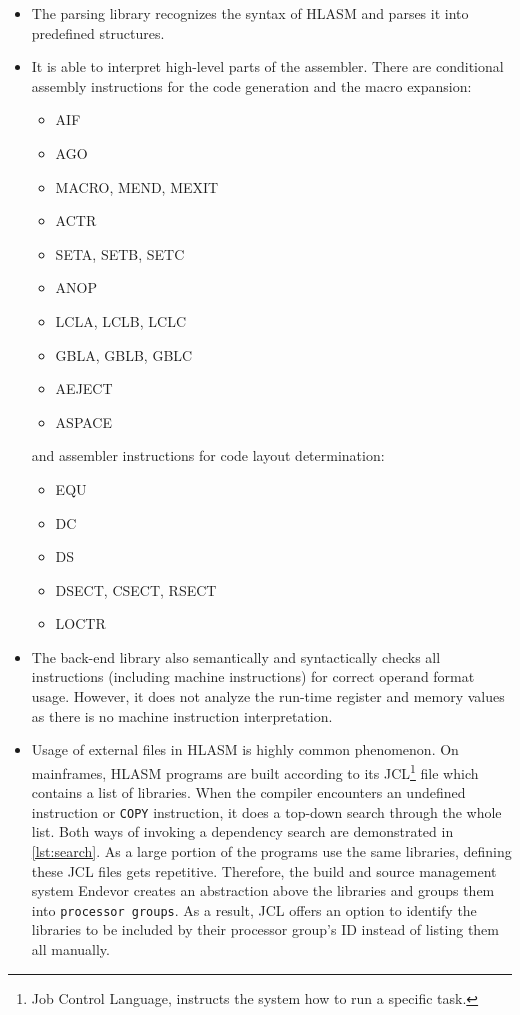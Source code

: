 \begin{itemize}
\item The parsing library recognizes the syntax of HLASM and parses it into predefined structures. 

\item It is able to interpret high-level parts of the assembler. There are conditional assembly instructions for the code generation and the macro expansion:
\begin{itemize}
    \item AIF
    \item AGO
    \item MACRO, MEND, MEXIT
    \item ACTR
    \item SETA, SETB, SETC
    \item ANOP
    \item LCLA, LCLB, LCLC
    \item GBLA, GBLB, GBLC
    \item AEJECT
    \item ASPACE
\end{itemize}
and assembler instructions for code layout determination:
\begin{itemize}
    \item EQU 
    \item DC 
    \item DS 
    \item DSECT, CSECT, RSECT 
    \item LOCTR
\end{itemize}

\item The back-end library also semantically and syntactically checks all instructions (including machine instructions) for correct operand format usage. However, it does not analyze the run-time register and memory values as there is no machine instruction interpretation.

\item Usage of external files in HLASM is highly common phenomenon. On mainframes, HLASM programs are built according to its JCL\footnote{Job Control Language, instructs the system how to run a specific task.} file which contains a list of libraries. When the compiler encounters an undefined instruction or \texttt{COPY} instruction, it does a top-down search through the whole list. Both ways of invoking a dependency search are demonstrated in \cref{lst:search}. As a large portion of the programs use the same libraries, defining these JCL files gets repetitive. Therefore, the build and source management system Endevor creates an abstraction above the libraries and groups them into \texttt{processor groups}. As a result, JCL offers an option to identify the libraries to be included by their processor group's ID instead of listing them all manually.


\end{itemize}
